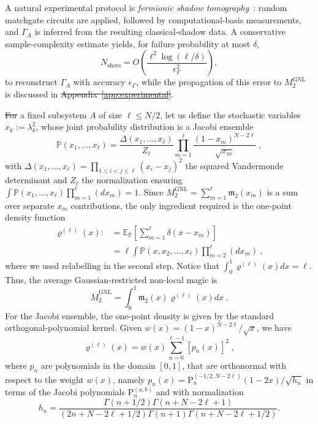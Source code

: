 \documentclass[aps,prl,twocolumn,superscriptaddress,reprint,longbibliography,nofootinbib]{revtex4-2}
\renewcommand{\log}{\operatorname{log}}\renewcommand{\det}{\operatorname{det}}
\providecommand{\DIFaddtex}[1]{{\protect\color{blue}\uwave{#1}}} %
\providecommand{\DIFdeltex}[1]{{\protect\color{red}\sout{#1}}}                      %
\providecommand{\DIFaddbegin}{} %
\providecommand{\DIFaddend}{} %
\providecommand{\DIFdelbegin}{} %
\providecommand{\DIFdelend}{} %
\providecommand{\DIFadd}[1]{\texorpdfstring{\DIFaddtex{#1}}{#1}} %
\providecommand{\DIFdel}[1]{\texorpdfstring{\DIFdeltex{#1}}{}} %
\newcommand{\DIFscaledelfig}{0.5}
\newlength{\DIFdelgraphicswidth} %
\newlength{\DIFdelgraphicsheight} %
\newcommand{\DIFaddincludegraphics}[2][]{{\color{blue}\fbox{\DIFOincludegraphics[#1]{#2}}}} %
\newcommand{\DIFdelincludegraphics}[2][]{%
\sbox{\DIFdelgraphicsbox}{\DIFOincludegraphics[#1]{#2}}%
\settoboxwidth{\DIFdelgraphicswidth}{\DIFdelgraphicsbox} %
\settoboxtotalheight{\DIFdelgraphicsheight}{\DIFdelgraphicsbox} %
\scalebox{\DIFscaledelfig}{%
\parbox[b]{\DIFdelgraphicswidth}{\usebox{\DIFdelgraphicsbox}\\[-\baselineskip] \rule{\DIFdelgraphicswidth}{0em}}\llap{\resizebox{\DIFdelgraphicswidth}{\DIFdelgraphicsheight}{%
\setlength{\unitlength}{\DIFdelgraphicswidth}%
\begin{picture}(1,1)%
\thicklines\linethickness{2pt} %
{\color[rgb]{1,0,0}\put(0,0){\framebox(1,1){}}}%
{\color[rgb]{1,0,0}\put(0,0){\line( 1,1){1}}}%
{\color[rgb]{1,0,0}\put(0,1){\line(1,-1){1}}}%
\end{picture}%
}\hspace*{3pt}}} %
} %
\DeclareRobustCommand{\DIFaddbegin}{\DIFOaddbegin \let\includegraphics\DIFaddincludegraphics} %
\DeclareRobustCommand{\DIFaddend}{\DIFOaddend \let\includegraphics\DIFOincludegraphics} %
\DeclareRobustCommand{\DIFdelbegin}{\DIFOdelbegin \let\includegraphics\DIFdelincludegraphics} %
\DeclareRobustCommand{\DIFdelend}{\DIFOaddend \let\includegraphics\DIFOincludegraphics} %
\begin{document}
A natural experimental protocol is \emph{fermionic shadow tomography}~\cite{Wan_2023}: random matchgate circuits are applied, followed by computational-basis measurements, and $\Gamma_A$ is inferred from the resulting classical-shadow data.
A conservative sample-complexity estimate yields, for failure probability at most $\delta$,
\[
N_{\mathrm{shots}} = O\!\left(\frac{\ell^2 \log(\ell/\delta)}{\epsilon_\Gamma^2}\right),
\]
to reconstruct \(\Gamma_A\) with accuracy \(\epsilon_\Gamma\), while the propagation of this error  to \(M_2^{\mathrm{GNL}}\) is discussed in  \DIFdelbegin \DIFdel{Appendix~\ref{app:experimental}}\DIFdelend \DIFaddbegin \DIFadd{the SM, Sec.~S3}\DIFaddend .

\DIFdelbegin \DIFdel{For }\DIFdelend \DIFaddbegin \textbf{\DIFadd{Finite-size Page curve.}}\DIFadd{---For }\DIFaddend a fixed subsystem $A$ of size $\ell\le N/2$, let us define the stochastic variables $x_k:=\lambda_k^2$, whose joint probability distribution is a Jacobi ensemble~\cite{Mehta2004,PhysRevB.103.L241118}
\begin{equation}
    \mathbb{P}(x_1,\dots,x_\ell) = \frac{\Delta(x_1,\dots,x_\ell)}{Z_\ell}  \prod_{m=1}^\ell \frac{(1-x_m)^{N-2\ell}}{\sqrt{x_m}}\;,
\end{equation}
with $\Delta(x_1,\dots,x_\ell)=\prod_{1\le i<j\le \ell} (x_i-x_j)^2$ the squared Vandermonde determinant  and $Z_\ell$ the normalization ensuring $\int \mathbb{P}(x_1,\dots,x_\ell)\prod_{m=1}^\ell (dx_m)=1$.
Since $M_2^\mathrm{GNL}=\sum_{m=1}^\ell \mathfrak{m}_2(x_m)$ is a sum over separate $x_m$ contributions, the only ingredient required is the one-point density function
\begin{equation}
\begin{split}
    \varrho^{(\ell)}(x):&=\mathbb{E}_\mathbb{P}\left[\sum_{m=1}^\ell \delta(x-x_m)\right] \\&= \ell \int \mathbb{P}(x,x_2,\dots,x_\ell)\prod_{m=2}^\ell (dx_m)\:,
\end{split}
\end{equation}
where we used relabelling in the second step. Notice that $\int_0^1 \varrho^{(\ell)}(x) dx = \ell$.
Thus, the average Gaussian-restricted non-local magic is
\begin{equation}
    \overline{M}_2^\mathrm{GNL}=\int_0^1 \mathfrak{m}_2(x) \varrho^{(\ell)}(x) dx\;.
\end{equation}
For the Jacobi ensemble, the one-point density is given by the standard orthogonal-polynomial kernel.
Given $w(x) = (1-x)^{N-2\ell}/\sqrt{x}$, we have~\cite{sierant2026theorymatchgatecommutant,sierant2026fermionic}
\begin{equation}
\varrho^{(\ell)}(x) = w(x) \sum_{n=0}^{\ell-1} [p_n(x)]^2\;,
\label{eq:ziopino}
\end{equation}
where $p_n$ are polynomials in the domain $[0,1]$, that are orthonormal with respect to the weight $w(x)$, namely $p_n(x) = \mathrm{P}_n^{(-1/2,N-2\ell)}(1-2x)/\sqrt{h_n}$ in terms of the Jacobi polynomials $\mathrm{P}_n^{(a,b)}$ and with normalization
\begin{equation}
    h_n=\frac{\Gamma(n+1/2) \Gamma(n+N-2\ell+1)}{(2n+N-2\ell+1/2) \Gamma(n+1)\Gamma(n+N-2\ell+1/2)}.
\end{equation}
\DIFdelbegin %
\end{document}
